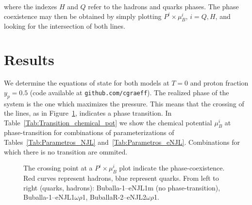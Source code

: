 \documentclass{ws-ijmpcs}
\begin{document}
\noindent{}where the indexes $H$ and $Q$ refer to the hadrons and quarks phases. The phase coexistence may then be obtained by simply plotting $P^i \times \mu_B^i$, $i = Q, H$, and looking for the intersection of both lines.

\section{Results}

We determine the equations of state for both models at $T = 0$ and proton fraction $y_p = 0.5$ (code available at \texttt{github.com/cgraeff}). The realized phase of the system is the one which maximizes the pressure. This means that the crossing of the lines, as in Figure~\ref{Fig:Pressure_func_chemical_pot}, indicates a phase transition.
%
In Table~\ref{Tab:Transition_chemical_pot} we show the chemical potential $\mu_B^i$ at phase-transition for combinations of parameterizations of Tables~\ref{Tab:Parametros_NJL} and~\ref{Tab:Parametros_eNJL}. Combinations for which there is no transition are ommited.

\begin{figure}
\caption{The crossing point at a $P^i \times \mu_B^i$ plot indicate the phase-coexistence. Red curves represent hadrons, blue represent quarks. From left to right (quarks, hadrons): Buballa-1--eNJL1m (no phase-transition), Buballa-1--eNJL1$\omega\rho$1, BuballaR-2--eNJL2$\omega\rho$1.\label{Fig:Pressure_func_chemical_pot}}

\end{figure}
\end{document}

